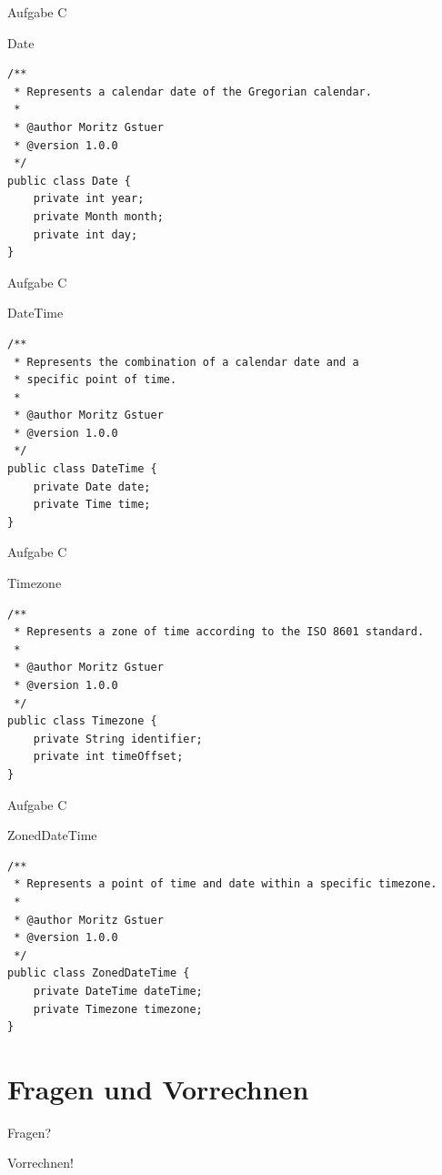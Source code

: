 \documentclass[aspectratio=169]{beamer}
\begin{document}
\begin{frame}[fragile]{Aufgabe C}
  \begin{block}{Date}
    \begin{lstlisting}
/**
 * Represents a calendar date of the Gregorian calendar.
 *
 * @author Moritz Gstuer
 * @version 1.0.0
 */
public class Date {
    private int year;
    private Month month;
    private int day;
}
    \end{lstlisting}
  \end{block}
\end{frame}

\begin{frame}[fragile]{Aufgabe C}
  \begin{block}{DateTime}
    \begin{lstlisting}
/**
 * Represents the combination of a calendar date and a
 * specific point of time.
 *
 * @author Moritz Gstuer
 * @version 1.0.0
 */
public class DateTime {
    private Date date;
    private Time time;
}
    \end{lstlisting}
  \end{block}
\end{frame}

\begin{frame}[fragile]{Aufgabe C}
  \begin{block}{Timezone}
    \begin{lstlisting}
/**
 * Represents a zone of time according to the ISO 8601 standard.
 *
 * @author Moritz Gstuer
 * @version 1.0.0
 */
public class Timezone {
    private String identifier;
    private int timeOffset;
}
    \end{lstlisting}
  \end{block}
\end{frame}

\begin{frame}[fragile]{Aufgabe C}
  \begin{block}{ZonedDateTime}
    \begin{lstlisting}
/**
 * Represents a point of time and date within a specific timezone.
 *
 * @author Moritz Gstuer
 * @version 1.0.0
 */
public class ZonedDateTime {
    private DateTime dateTime;
    private Timezone timezone;
}
    \end{lstlisting}
  \end{block}
\end{frame}

\section{Fragen und Vorrechnen}

\begin{frame}
  \begin{center}\LARGE Fragen?\end{center}
\end{frame}

\begin{frame}
  \begin{center}\LARGE Vorrechnen!\end{center}
\end{frame}
\end{document}
